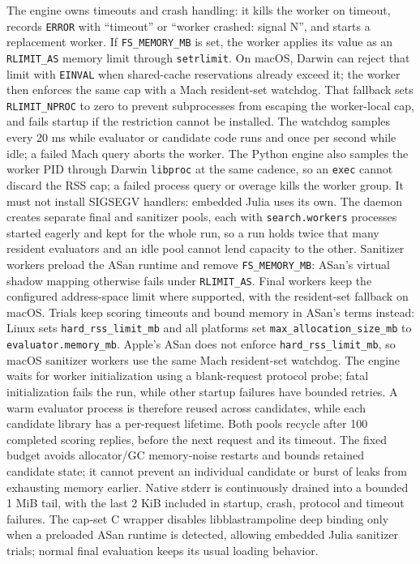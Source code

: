 \documentclass[11pt]{article}
\newcommand{\code}[1]{\texttt{#1}}
\begin{document}
The engine owns timeouts and crash handling: it kills the worker on timeout,
records \code{ERROR} with ``timeout'' or ``worker crashed: signal N'', and
starts a replacement worker. If \code{FS\_MEMORY\_MB} is set, the worker applies its value as an
\code{RLIMIT\_AS} memory limit through \code{setrlimit}. On macOS, Darwin can
reject that limit with \code{EINVAL} when shared-cache reservations already
exceed it; the worker then enforces the same cap with a Mach resident-set
watchdog. That fallback sets \code{RLIMIT\_NPROC} to zero to prevent
subprocesses from escaping the worker-local cap, and fails startup if the
restriction cannot be installed. The watchdog samples every 20 ms while
evaluator or candidate code runs and once per second while idle; a failed Mach
query aborts the worker. The Python engine also samples the worker PID through
Darwin \code{libproc} at the same cadence, so an \code{exec} cannot discard the
RSS cap; a failed process query or overage kills the worker group. It must not
install SIGSEGV handlers: embedded Julia uses its own.
The daemon creates separate final and sanitizer
pools, each with \code{search.workers} processes started eagerly and kept for
the whole run, so a run holds twice that many resident evaluators and an idle
pool cannot lend capacity to the other. Sanitizer workers preload
the ASan runtime and remove \code{FS\_MEMORY\_MB}: ASan's virtual shadow
mapping otherwise fails under \code{RLIMIT\_AS}. Final workers keep the
configured address-space limit where supported, with the resident-set fallback
on macOS. Trials keep scoring timeouts and bound memory in ASan's terms instead:
Linux sets \code{hard\_rss\_limit\_mb} and all platforms set
\code{max\_allocation\_size\_mb} to \code{evaluator.memory\_mb}. Apple's ASan
does not enforce \code{hard\_rss\_limit\_mb}, so macOS sanitizer workers use
the same Mach resident-set watchdog. The engine
waits for worker initialization using a blank-request protocol probe; fatal
initialization fails the run, while other startup failures have bounded retries.
A warm evaluator process is therefore reused across
candidates, while each candidate library has a per-request lifetime.
Both pools recycle after 100 completed scoring replies, before the next
request and its timeout. The fixed budget avoids allocator/GC memory-noise
restarts and bounds retained candidate state; it cannot prevent an individual
candidate or burst of leaks from exhausting memory earlier. Native stderr is
continuously drained into a bounded 1 MiB tail, with the last 2 KiB included
in startup, crash, protocol and timeout failures.
The cap-set C wrapper disables libblastrampoline deep binding only when a
preloaded ASan runtime is detected, allowing embedded Julia sanitizer trials;
normal final evaluation keeps its usual loading behavior.
\end{document}
